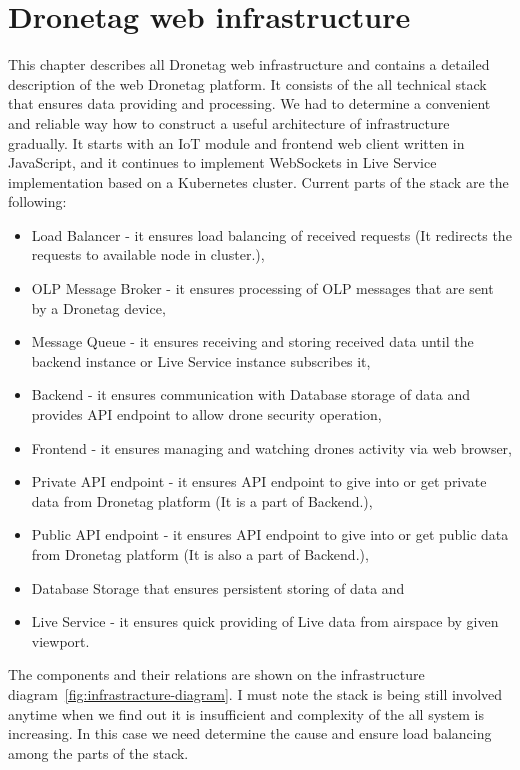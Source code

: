 \chapter{Dronetag web infrastructure}\label{ch:dronetag-web-infrastructure}
This chapter describes all Dronetag web infrastructure and contains a detailed description of the web Dronetag platform.
It consists of the all technical stack that ensures data providing and processing.
We had to determine a convenient and reliable way how to construct a useful architecture of infrastructure gradually.
It starts with an IoT module and frontend web client written in JavaScript, and it continues to implement WebSockets in Live Service implementation based on a Kubernetes cluster.
Current parts of the stack are the following:
\begin{itemize}
    \item Load Balancer - it ensures load balancing of received requests (It redirects the requests to available node in cluster.),
    \item OLP Message Broker - it ensures processing of OLP messages that are sent by a Dronetag device,
    \item Message Queue - it ensures receiving and storing received data until the backend instance or Live Service instance subscribes it,
    \item Backend - it ensures communication with Database storage of data and provides API endpoint to allow drone security operation,
    \item Frontend - it ensures managing and watching drones activity via web browser,
    \item Private API endpoint - it ensures API endpoint to give into or get private data from Dronetag platform (It is a part of Backend.),
    \item Public API endpoint - it ensures API endpoint to give into or get public data from Dronetag platform (It is also a part of Backend.),
    \item Database Storage that ensures persistent storing of data and
    \item Live Service - it ensures quick providing of Live data from airspace by given viewport.
\end{itemize}
The components and their relations are shown on the infrastructure diagram~\ref{fig:infrastracture-diagram}.
I must note the stack is being still involved anytime when we find out it is insufficient and complexity of the all system is increasing.
In this case we need determine the cause and ensure load balancing among the parts of the stack.


